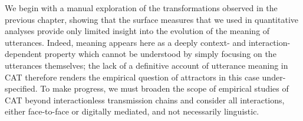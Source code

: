 \documentclass[english,]{article}
\begin{document}
We begin with a manual exploration of the transformations observed in the previous chapter, showing that the surface measures that we used in quantitative analyses provide only limited insight into the evolution of the meaning of utterances.
Indeed, meaning appears here as a deeply context- and interaction-dependent property which cannot be understood by simply focusing on the utterances themselves;
the lack of a definitive account of utterance meaning in CAT therefore renders the empirical question of attractors in this case under-specified.
To make progress, we must broaden the scope of empirical studies of CAT beyond interactionless transmission chains and consider all interactions, either face-to-face or digitally mediated, and not necessarily linguistic.
\end{document}
